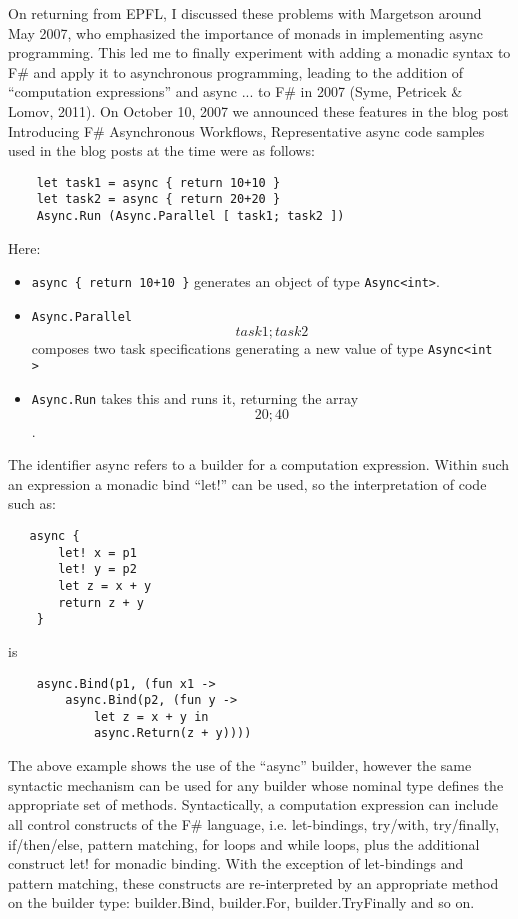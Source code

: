 \documentclass[acmsmall,review]{acmart}\settopmatter{printfolios=true,printccs=false,printacmref=false}
\begin{document}
On returning from EPFL, I discussed these problems with Margetson around May 2007, who emphasized the importance of monads in implementing async programming. This led me to finally experiment with adding a monadic syntax to F\# and apply it to asynchronous programming, leading to the addition of “computation expressions” and async { ... } to F\# in 2007 (Syme, Petricek \& Lomov, 2011).  On October 10, 2007 we announced these features in the blog post Introducing F\# Asynchronous Workflows,  Representative async code samples used in the blog posts at the time were as follows:

\begin{verbatim}
    let task1 = async { return 10+10 }
    let task2 = async { return 20+20 }
    Async.Run (Async.Parallel [ task1; task2 ])
\end{verbatim}

Here:
\begin{itemize}
\item \texttt{async \{ return 10+10 \}} generates an object of type \texttt{Async<int>}.  
\item \texttt{Async.Parallel \[ task1; task2 \]} composes two task specifications generating a new value of type \texttt{Async<int\[\]>}
\item \texttt{Async.Run} takes this and runs it, returning the array \texttt{\[20; 40\]}. 
\end{itemize}

The identifier async refers to a builder for a computation expression. Within such an expression a monadic bind “let!” can be used, so the interpretation of code such as:
\begin{verbatim}
   async { 
       let! x = p1 
       let! y = p2
       let z = x + y
       return z + y 
    }
\end{verbatim}
is
\begin{verbatim}
    async.Bind(p1, (fun x1 -> 
        async.Bind(p2, (fun y -> 
            let z = x + y in
            async.Return(z + y))))
\end{verbatim}
The above example shows the use of the “async” builder, however the same syntactic mechanism can be used for any builder whose nominal type defines the appropriate set of methods.  Syntactically, a computation expression can include all control constructs of the F\# language, i.e. let-bindings, try/with, try/finally, if/then/else, pattern matching, for loops and while loops, plus the additional construct let! for monadic binding. With the exception of let-bindings and pattern matching, these constructs are re-interpreted by an appropriate method on the builder type: builder.Bind, builder.For, builder.TryFinally and so on.  
\end{document}
